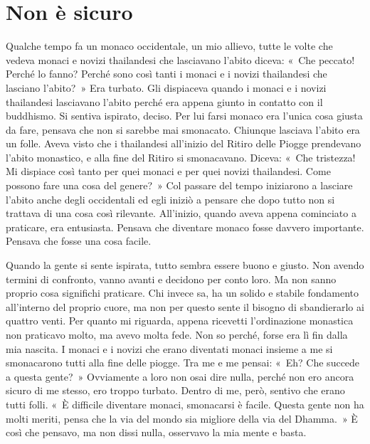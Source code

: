 \chapter{Non è sicuro}

Qualche tempo fa un monaco occidentale, un mio allievo, tutte le volte
che vedeva monaci e novizi thailandesi che lasciavano l'abito diceva:
«~Che peccato! Perché lo fanno? Perché sono così tanti i monaci e i
novizi thailandesi che lasciano l'abito?~» Era turbato. Gli dispiaceva
quando i monaci e i novizi thailandesi lasciavano l'abito perché era
appena giunto in contatto con il buddhismo. Si sentiva ispirato, deciso.
Per lui farsi monaco era l'unica cosa giusta da fare, pensava che non si
sarebbe mai smonacato. Chiunque lasciava l'abito era un folle. Aveva
visto che i thailandesi all'inizio del Ritiro delle Piogge prendevano
l'abito monastico, e alla fine del Ritiro si smonacavano. Diceva: «~Che
tristezza! Mi dispiace così tanto per quei monaci e per quei novizi
thailandesi. Come possono fare una cosa del genere?~» Col passare del
tempo iniziarono a lasciare l'abito anche degli occidentali ed egli
iniziò a pensare che dopo tutto non si trattava di una cosa così
rilevante. All'inizio, quando aveva appena cominciato a praticare, era
entusiasta. Pensava che diventare monaco fosse davvero importante.
Pensava che fosse una cosa facile.

Quando la gente si sente ispirata, tutto sembra essere buono e giusto.
Non avendo termini di confronto, vanno avanti e decidono per conto loro.
Ma non sanno proprio cosa significhi praticare. Chi invece sa, ha un
solido e stabile fondamento all'interno del proprio cuore, ma non per
questo sente il bisogno di sbandierarlo ai quattro venti. Per quanto mi
riguarda, appena ricevetti l'ordinazione monastica non praticavo molto,
ma avevo molta fede. Non so perché, forse era lì fin dalla mia nascita.
I monaci e i novizi che erano diventati monaci insieme a me si
smonacarono tutti alla fine delle piogge. Tra me e me pensai: «~Eh? Che
succede a questa gente?~» Ovviamente a loro non osai dire nulla, perché
non ero ancora sicuro di me stesso, ero troppo turbato. Dentro di me,
però, sentivo che erano tutti folli. «~È difficile diventare monaci,
smonacarsi è facile. Questa gente non ha molti meriti, pensa che la via
del mondo sia migliore della via del Dhamma.~» È così che pensavo, ma
non dissi nulla, osservavo la mia mente e basta.


